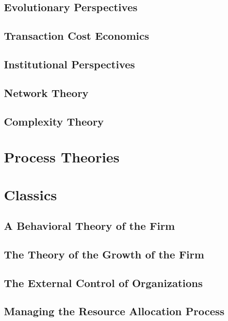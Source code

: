 \documentclass[12pt,letterpaper]{article}
\begin{document}
\subsection{Evolutionary Perspectives}

\subsection{Transaction Cost Economics}

\subsection{Institutional Perspectives}

\subsection{Network Theory}

\subsection{Complexity Theory}


\newpage

\section{Process Theories}



\newpage

\section{Classics}
\subsection{A Behavioral Theory of the Firm}
\subsection{The Theory of the Growth of the Firm}
\subsection{The External Control of Organizations}
\subsection{Managing the Resource Allocation Process}
\end{document}

